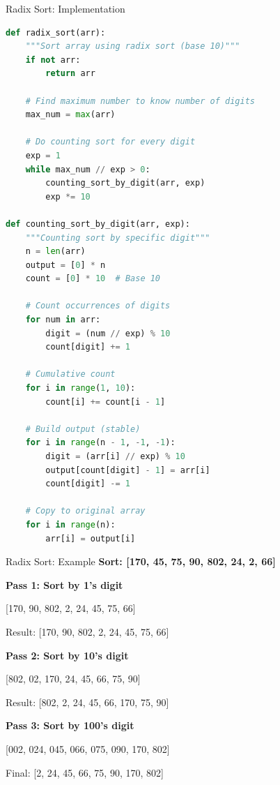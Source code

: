 \documentclass[aspectratio=169]{beamer}
\begin{document}
\begin{frame}[fragile]{Radix Sort: Implementation}
\begin{lstlisting}[language=Python, basicstyle=\ttfamily\tiny]
def radix_sort(arr):
    """Sort array using radix sort (base 10)"""
    if not arr:
        return arr

    # Find maximum number to know number of digits
    max_num = max(arr)

    # Do counting sort for every digit
    exp = 1
    while max_num // exp > 0:
        counting_sort_by_digit(arr, exp)
        exp *= 10

def counting_sort_by_digit(arr, exp):
    """Counting sort by specific digit"""
    n = len(arr)
    output = [0] * n
    count = [0] * 10  # Base 10

    # Count occurrences of digits
    for num in arr:
        digit = (num // exp) % 10
        count[digit] += 1

    # Cumulative count
    for i in range(1, 10):
        count[i] += count[i - 1]

    # Build output (stable)
    for i in range(n - 1, -1, -1):
        digit = (arr[i] // exp) % 10
        output[count[digit] - 1] = arr[i]
        count[digit] -= 1

    # Copy to original array
    for i in range(n):
        arr[i] = output[i]
\end{lstlisting}
\end{frame}

\begin{frame}{Radix Sort: Example}
  \textbf{Sort: [170, 45, 75, 90, 802, 24, 2, 66]}

  \vspace{0.3cm}
  \textbf{Pass 1: Sort by 1's digit}
  \begin{center}
  [17{\color{red}0}, 9{\color{red}0}, 80{\color{red}2}, {\color{red}2}, 2{\color{red}4}, 4{\color{red}5}, 7{\color{red}5}, 6{\color{red}6}]

  Result: [170, 90, 802, 2, 24, 45, 75, 66]
  \end{center}

  \vspace{0.3cm}
  \textbf{Pass 2: Sort by 10's digit}
  \begin{center}
  [8{\color{red}0}2, {\color{red}0}2, 1{\color{red}7}0, {\color{red}2}4, {\color{red}4}5, 6{\color{red}6}, {\color{red}7}5, {\color{red}9}0]

  Result: [802, 2, 24, 45, 66, 170, 75, 90]
  \end{center}

  \vspace{0.3cm}
  \textbf{Pass 3: Sort by 100's digit}
  \begin{center}
  [{\color{red}0}02, {\color{red}0}24, {\color{red}0}45, {\color{red}0}66, {\color{red}0}75, {\color{red}0}90, {\color{red}1}70, {\color{red}8}02]

  Final: [2, 24, 45, 66, 75, 90, 170, 802]
  \end{center}
\end{frame}
\end{document}
